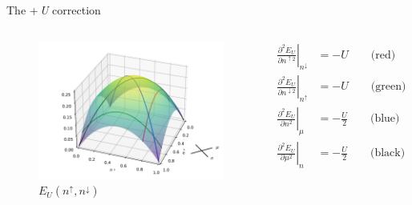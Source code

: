 \documentclass[xcolor=table,aspectratio=169]{beamer}
\numberwithin{equation}{section}
\begin{document}
\begin{frame}{The +\,\emph{U} correction}
    \begin{columns}
        \begin{figure}[h!]
            \includegraphics[width=\columnwidth]{figures/u_correction_with_paths.pdf}
            \caption{$E_{U}(n^\uparrow,n^\downarrow)$}
            \label{fig:u_correction_with_paths}
        \end{figure}
        \small
        \begin{subequations}
            \begin{align}
                \left.\frac{\partial^2E_{U}}{\partial n^{\uparrow 2}}\right|_{n^\downarrow} & = -U \qquad \text{(red)}             \\
                \left.\frac{\partial^2E_{U}}{\partial n^{\downarrow 2}}\right|_{n^\uparrow} & = -U \qquad \text{(green)}           \\
                \left.\frac{\partial^2E_{U}}{\partial n^2}\right|_{\mu}                     & = -\frac{U}{2} \qquad \text{(blue)}  \\
                \left.\frac{\partial^2E_{U}}{\partial \mu^2 }\right|_{n}                    & = -\frac{U}{2} \qquad \text{(black)}
            \end{align}
        \end{subequations}
    \end{columns}
\end{frame}
\end{document}
